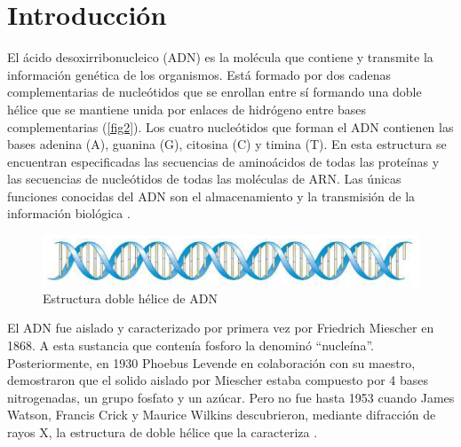\documentclass[fleqn,10pt]{SelfArx}
\begin{document}
\flushbottom %

\maketitle %

\thispagestyle{empty} %




\section*{Introducci\'on} %
	El ácido desoxirribonucleico (ADN) es la molécula que contiene y transmite la información genética de los organismos. Está formado por dos cadenas complementarias de nucleótidos que se enrollan entre sí formando una doble hélice que se mantiene unida por enlaces de hidrógeno entre bases complementarias (\autoref{fig2}). Los cuatro nucleótidos que forman el ADN contienen las bases adenina (A), guanina (G), citosina (C) y timina (T). En esta estructura se encuentran especificadas las secuencias de aminoácidos de todas las proteínas y las secuencias de nucleótidos de todas las moléculas de ARN. Las únicas funciones conocidas del ADN son el almacenamiento y la transmisión de la información biológica \cite{dahm2005friedrich, nelson2008lehninger, watson1953molecular}.
	\begin{figure}[h]
		\centering
		\includegraphics[width=\linewidth]{dna}
		\caption{Estructura doble hélice de ADN}
		\label{fig2}
	\end{figure}
	
	El ADN fue aislado y caracterizado por primera vez por Friedrich Miescher en 1868. A esta sustancia que contenía fosforo la denominó “nucleína”. Posteriormente, en 1930 Phoebus Levende en colaboración con su maestro, demostraron que el solido aislado por Miescher estaba compuesto por 4 bases nitrogenadas, un grupo fosfato y un azúcar. Pero no fue hasta 1953 cuando James Watson, Francis Crick y Maurice Wilkins descubrieron, mediante difracción de rayos X, la estructura de doble hélice que la caracteriza \cite{nelson2008lehninger, watson1953molecular, maddox2003double}.
	
\end{document}
